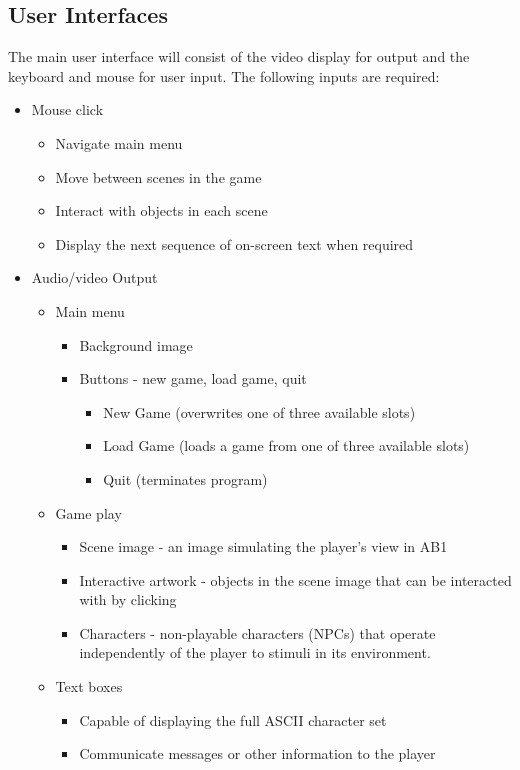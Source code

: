 \documentclass{article}
\begin{document}
	\subsection{User Interfaces}
		The main user interface will consist of the video display for output and the keyboard and mouse for user input. The following inputs are required:
		\begin{itemize}
			\item Mouse click
				\begin{itemize}
					\item Navigate main menu
					\item Move between scenes in the game
					\item Interact with objects in each scene
					\item Display the next sequence of on-screen text when required
				\end{itemize}
			\item Audio/video Output
				\begin{itemize}
					\item Main menu
					\begin{itemize}
						\item Background image
						\item Buttons - new game, load game, quit
						\begin{itemize}
							\item New Game (overwrites one of three available slots)
							\item Load Game (loads a game from one of three available slots)
							\item Quit (terminates program)
						\end{itemize}
					\end{itemize}
					\item Game play
					\begin{itemize}
						\item Scene image - an image simulating the player's view in AB1
						\item Interactive artwork - objects in the scene image that can be interacted with by clicking
						\item Characters - non-playable characters (NPCs) that operate independently of the player to stimuli in its environment. 
					\end{itemize}
					\item Text boxes
					\begin{itemize}
						\item Capable of displaying the full ASCII character set
						\item Communicate messages or other information to the player
					\end{itemize}
				\end{itemize}
			\end{itemize}
\end{document}
